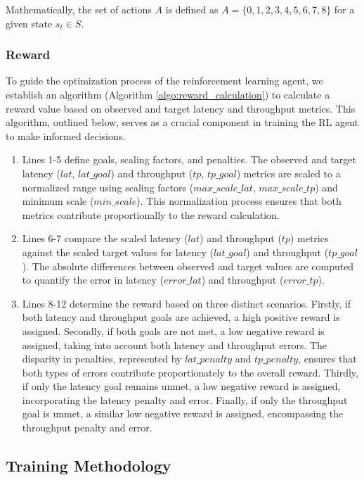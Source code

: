   Mathematically, the set of actions $A$ is defined as $A = \{0,1,2,3,4,5,6,7,8\}$ for a given state $s_t \in S$.

\subsubsection{Reward}

To guide the optimization process of the reinforcement learning agent, we establish an algorithm (Algorithm \ref{algo:reward_calculation}) to calculate a reward value based on observed and target latency and throughput metrics. This algorithm, outlined below, serves as a crucial component in training the RL agent to make informed decisions.

\begin{enumerate}
  \item Lines 1-5 define goals, scaling factors, and penalties. The observed and target latency ($lat$, $lat\_goal$) and throughput ($tp$, $tp\_goal$) metrics are scaled to a normalized range using scaling factors ($max\_scale\_lat$, $max\_scale\_tp$) and minimum scale ($min\_scale$). This normalization process ensures that both metrics contribute proportionally to the reward calculation.
  \item Lines 6-7 compare the scaled latency ($lat$) and throughput ($tp$) metrics against the scaled target values for latency ($lat\_goal$) and throughput ($tp\_goal$). The absolute differences between observed and target values are computed to quantify the error in latency ($error\_lat$) and throughput ($error\_tp$).
  \item Lines 8-12 determine the reward based on three distinct scenarios. Firstly, if both latency and throughput goals are achieved, a high positive reward is assigned. Secondly, if both goals are not met, a low negative reward is assigned, taking into account both latency and throughput errors. The disparity in penalties, represented by $lat\_penalty$ and $tp\_penalty$, ensures that both types of errors contribute proportionately to the overall reward. Thirdly, if only the latency goal remains unmet, a low negative reward is assigned, incorporating the latency penalty and error. Finally, if only the throughput goal is unmet, a similar low negative reward is assigned, encompassing the throughput penalty and error.
\end{enumerate}

\subsection{Training Methodology}

